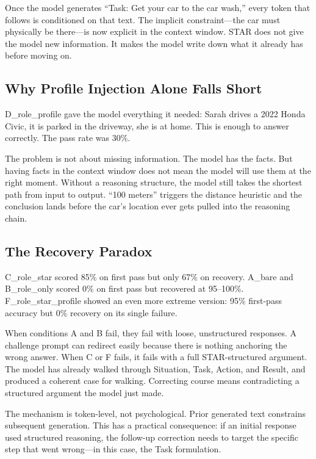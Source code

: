 \documentclass[11pt]{article}
\begin{document}
Once the model generates ``Task: Get your car to the car wash,'' every token that follows is conditioned on that text. The implicit constraint---the car must physically be there---is now explicit in the context window. STAR does not give the model new information. It makes the model write down what it already has before moving on.

\subsection{Why Profile Injection Alone Falls Short}

D\_role\_profile gave the model everything it needed: Sarah drives a 2022 Honda Civic, it is parked in the driveway, she is at home. This is enough to answer correctly. The pass rate was 30\%.

The problem is not about missing information. The model has the facts. But having facts in the context window does not mean the model will use them at the right moment. Without a reasoning structure, the model still takes the shortest path from input to output. ``100 meters'' triggers the distance heuristic and the conclusion lands before the car's location ever gets pulled into the reasoning chain.

\subsection{The Recovery Paradox}
\label{sec:recovery}

C\_role\_star scored 85\% on first pass but only 67\% on recovery. A\_bare and B\_role\_only scored 0\% on first pass but recovered at 95--100\%. F\_role\_star\_profile showed an even more extreme version: 95\% first-pass accuracy but 0\% recovery on its single failure.

When conditions A and B fail, they fail with loose, unstructured responses. A challenge prompt can redirect easily because there is nothing anchoring the wrong answer. When C or F fails, it fails with a full STAR-structured argument. The model has already walked through Situation, Task, Action, and Result, and produced a coherent case for walking. Correcting course means contradicting a structured argument the model just made.

The mechanism is token-level, not psychological. Prior generated text constrains subsequent generation. This has a practical consequence: if an initial response used structured reasoning, the follow-up correction needs to target the specific step that went wrong---in this case, the Task formulation.
\end{document}
